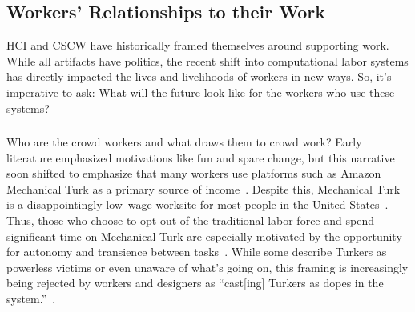 \documentclass[pn4226]{subfiles}
\begin{document}
\subsection[What will work and the place of work look like for workers]{Workers' Relationships to their Work}\label{sec:relationships}

HCI and CSCW have historically framed themselves around supporting work.
While all artifacts have politics,
the recent shift into computational labor systems has directly impacted
the lives and livelihoods of workers in new ways.
So, it's imperative to ask:
What will the future look like for the workers who use these systems?

\subsubsection{\crowdworkpers}
\begin{comment}
	- Workers do it for money
	- Workers coordinate and communicate (gray, being a turker, team stuff). there is mega--drama
	- Workers don't like requesters. have tried to organize
\end{comment}

Who are the crowd workers and what draws them to crowd work?
Early literature emphasized motivations like fun and spare change, but this narrative soon shifted to emphasize that many workers use platforms such as Amazon Mechanical Turk as a primary source of income~\cite{kaufmann2011more,ipeirotis2010demographics,Antin2012a}.
Despite this, Mechanical Turk is a disappointingly low--wage worksite for most people in the United States~\cite{ipeirotis2010demographics,martin2014being,gupta2014turk}.
Thus, those who choose to opt out of the traditional labor force and spend significant time on Mechanical Turk are especially motivated by the opportunity for autonomy and transience between tasks~\cite{kaufmann2011more}.
While some describe Turkers as powerless victims or even unaware of what's going on,
this framing is increasingly being rejected by workers and designers as
``cast[ing] Turkers as dopes in the system.''~\cite{storiesIraniSilberman}.
\end{document}
